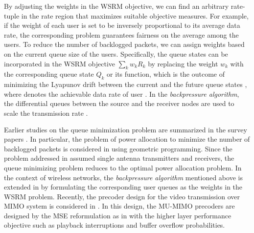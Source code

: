 By adjusting the weights in the \ac{WSRM} objective, we can find an arbitrary rate-tuple in the rate region that maximizes suitable objective measures. For example, if the weight of each user is set to be inversely proportional to its average data rate, the corresponding problem guarantees fairness on the average among the users. To reduce the number of backlogged packets, we can assign weights based on the current queue size of the users. Specifically, the queue states can be incorporated in the \ac{WSRM} objective $\sum_k w_k R_k$ by replacing the weight $w_k$ with the corresponding queue state $Q_k$ or its function, which is the outcome of minimizing the Lyapunov drift between the current and the future queue states \cite{neely2010stochastic}, where  denotes the achievable data rate of user . In the \textit{backpressure algorithm}, the differential queues between the source and the receiver nodes are used to scale the transmission rate \cite{georgiadis2006resource}.

Earlier studies on the queue minimization problem are summarized in the survey papers \cite{berry2004cross,layering_as_opt}. In particular, the problem of power allocation to minimize the number of backlogged packets is considered in \cite{qps_cioffi} using geometric programming. Since the problem addressed in \cite{qps_cioffi} assumed single antenna transmitters and receivers, the queue minimizing problem reduces to the optimal power allocation problem. In the context of wireless networks, the \textit{backpressure algorithm} mentioned above is extended in \cite{weeraddana2011resource} by formulating the corresponding user queues as the weights in the \ac{WSRM} problem. Recently, the precoder design for the video transmission over \ac{MIMO} system is considered in \cite{video_queues}. In this design, the \ac{MU}-\ac{MIMO} precoders are designed by the \ac{MSE} reformulation as in \cite{christensen2008weighted} with the higher layer performance objective such as playback interruptions and buffer overflow probabilities.

